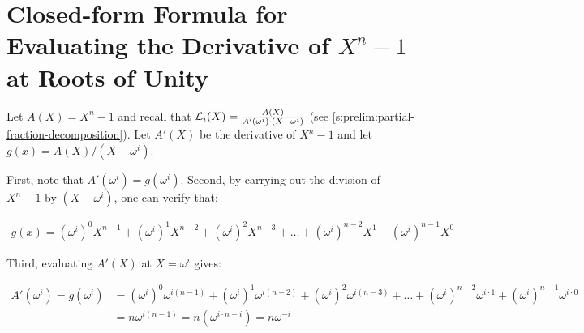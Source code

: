 \ifCameraReady
\else
\section{Closed-form Formula for Evaluating the Derivative of $X^n - 1$ at Roots of Unity}
\label{app:xn-1-derivative}

Let $A(X)=X^n - 1$ and recall that $\mathcal{L}_i(X) = \frac{A(X)}{A'(\omega^i)\cdot(X-\omega^i)}$ (see \cref{s:prelim:partial-fraction-decomposition}).
Let $A'(X)$ be the derivative of $X^n - 1$ and let $g(x)=A(X)/(X-\omega^i)$.

First, note that $A'(\omega^i)=g(\omega^i)$.
Second, by carrying out the division of $X^n -1$ by $(X-\omega^i)$, one can verify that:

\begin{align}
g(x) = (\omega^i)^0 X^{n-1} + (\omega^i)^1 X^{n-2} + (\omega^i)^2 X^{n-3} + \dots + (\omega^i)^{n-2} X^1 + (\omega^i)^{n-1} X^0
\end{align}

Third, evaluating $A'(X)$ at $X=\omega^i$ gives:

\begin{align}
A'(\omega^i) = g(\omega^i) &= (\omega^i)^0 \omega^{i(n-1)} + (\omega^i)^1 \omega^{i(n-2)} + (\omega^i)^2 \omega^{i(n-3)} + \dots + (\omega^i)^{n-2} \omega^{i\cdot1} + (\omega^i)^{n-1} \omega^{i\cdot0}\\
&= n\omega^{i(n-1)} = n(\omega^{i\cdot n-i})=n\omega^{-i}
\end{align}





\fi
